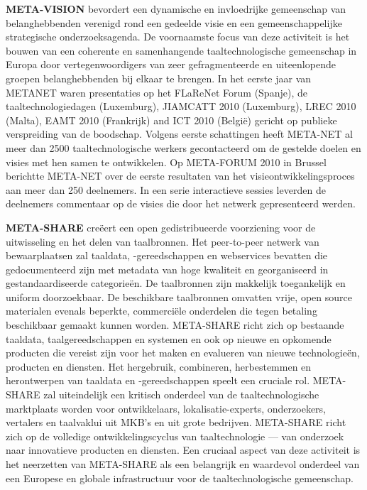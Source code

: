 \documentclass[]{../../metanetpaper}
\begin{document}
\begin{multicols}{2}
    \textbf{META-VISION} bevordert een dynamische en invloedrijke gemeenschap van belanghebbenden verenigd rond een gedeelde visie en een gemeenschappelijke strategische onderzoeksagenda. De voornaamste focus van deze activiteit is het bouwen van een coherente en samenhangende taaltechnologische gemeenschap in Europa door vertegenwoordigers van zeer gefragmenteerde en uiteenlopende groepen belanghebbenden bij elkaar te brengen. In het eerste jaar van METANET waren presentaties op het FLaReNet Forum (Spanje), de taaltechnologiedagen (Luxemburg), JIAMCATT 2010 (Luxemburg), LREC 2010 (Malta), EAMT 2010 (Frankrijk) and ICT 2010 (Belgi{\"e}) gericht op publieke verspreiding van de boodschap. Volgens eerste schattingen heeft META-NET al meer dan 2500 taaltechnologische werkers gecontacteerd om de gestelde doelen en visies met hen samen te ontwikkelen. Op META-FORUM 2010 in Brussel berichtte META-NET over de eerste resultaten van het visieontwikkelingsproces aan meer dan 250 deelnemers. In een serie interactieve sessies leverden de deelnemers commentaar op de visies die door het netwerk gepresenteerd werden.

    \textbf{META-SHARE} cre{\"e}ert een open gedistribueerde voorziening voor de uitwisseling en het delen van taalbronnen. Het peer-to-peer netwerk van bewaarplaatsen zal taaldata, -gereedschappen en webservices bevatten die gedocumenteerd zijn met metadata van hoge kwaliteit en georganiseerd in gestandaardiseerde categorie{\"e}n. De taalbronnen zijn makkelijk toegankelijk en uniform doorzoekbaar. De beschikbare taalbronnen omvatten vrije, open source materialen evenals beperkte, commerci{\"e}le onderdelen die tegen betaling beschikbaar gemaakt kunnen worden. META-SHARE richt zich op bestaande taaldata, taalgereedschappen en systemen en ook op nieuwe en opkomende producten die vereist zijn voor het maken en evalueren van nieuwe technologie{\"e}n, producten en diensten. Het hergebruik, combineren, herbestemmen en herontwerpen van taaldata en -gereedschappen speelt een cruciale rol. META-SHARE zal uiteindelijk een kritisch onderdeel van de taaltechnologische marktplaats worden voor ontwikkelaars, lokalisatie-experts, onderzoekers, vertalers en taalvaklui uit MKB's en uit grote bedrijven. META-SHARE richt zich op de volledige ontwikkelingscyclus van taaltechnologie --- van onderzoek naar innovatieve producten en diensten. Een cruciaal aspect van deze activiteit is het neerzetten van META-SHARE als een belangrijk en waardevol onderdeel van een Europese en globale infrastructuur voor de taaltechnologische gemeenschap.


\end{multicols}
\end{document}
